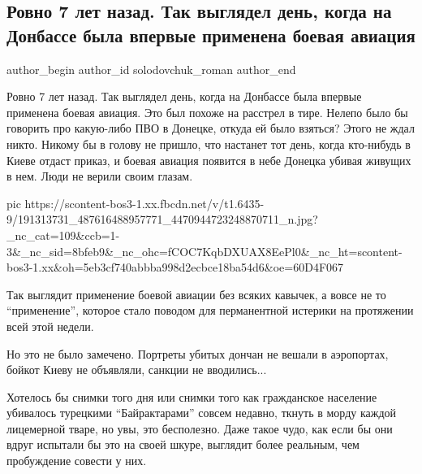  
 
 
 
 
 
\subsection{Ровно 7 лет назад. Так выглядел день, когда на Донбассе была впервые применена боевая авиация}
\label{sec:27_05_2021.fb.solodovchuk_roman.1.aviacia_vojna_donbass}
\ifcmt
 author_begin
   author_id solodovchuk_roman
 author_end
\fi

Ровно 7 лет назад. Так выглядел день, когда на Донбассе была впервые применена
боевая авиация. Это был похоже на расстрел в тире. Нелепо было бы говорить про
какую-либо ПВО в Донецке, откуда ей было взяться? Этого не ждал никто. Никому
бы в голову не пришло, что настанет тот день, когда кто-нибудь в Киеве отдаст
приказ, и боевая авиация появится в небе Донецка убивая живущих в нем. Люди не
верили своим глазам. 

\ifcmt
  pic https://scontent-bos3-1.xx.fbcdn.net/v/t1.6435-9/191313731_487616488957771_4470944723248870711_n.jpg?_nc_cat=109&ccb=1-3&_nc_sid=8bfeb9&_nc_ohc=fCOC7KqbDXUAX8EePl0&_nc_ht=scontent-bos3-1.xx&oh=5eb3cf740abbba998d2ecbce18ba54d6&oe=60D4F067
\fi

Так выглядит применение боевой авиации без всяких кавычек, а вовсе не то
\enquote{применение}, которое стало поводом для перманентной истерики на протяжении
всей этой недели. 

Но это не было замечено. Портреты убитых дончан не вешали в аэропортах, бойкот
Киеву не объявляли, санкции не вводились... 

Хотелось бы снимки того дня или снимки того как гражданское население убивалось
турецкими \enquote{Байрактарами} совсем недавно, ткнуть в морду каждой лицемерной
тваре, но увы, это бесполезно. Даже такое чудо, как если бы они вдруг испытали
бы это на своей шкуре, выглядит более реальным, чем пробуждение совести у них.
